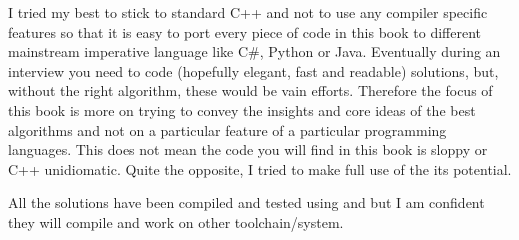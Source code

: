 I tried my best to stick to standard C++ and not to use any compiler specific features so that it is easy to port every piece of code in this book to different mainstream imperative language like C\#, Python or Java.  
Eventually during an interview you need to code (hopefully elegant, fast and readable) solutions, but, without the right algorithm, these would be vain efforts. Therefore the focus of this book is more on trying to convey the insights and core ideas of the best algorithms and not on a particular feature of a particular programming languages.
This does not mean the code you will find in this book is sloppy or C++ unidiomatic. Quite the opposite, I tried to make full use of the its potential.

All the solutions have been compiled and tested using  and  but I am confident they will compile and work on other toolchain/system. 

